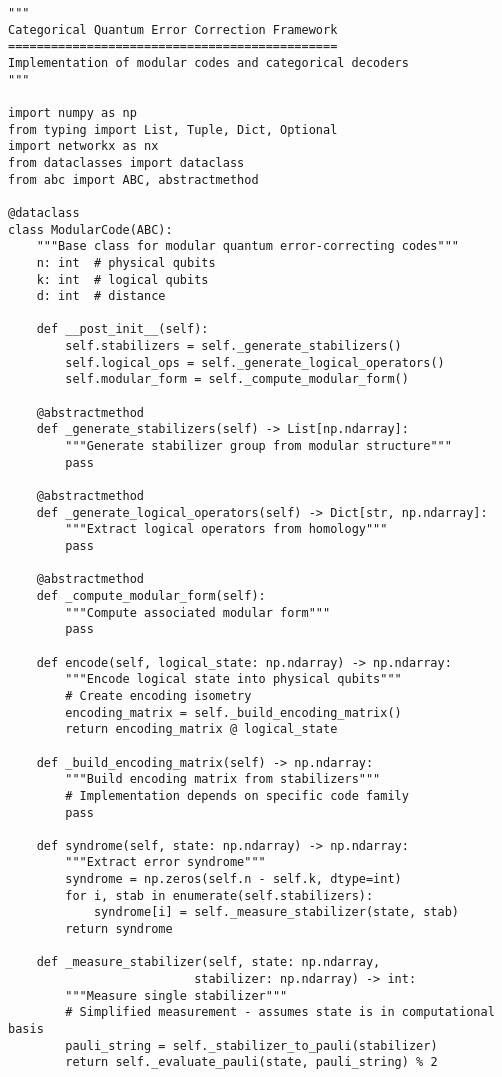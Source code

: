 \documentclass[12pt,a4paper]{article}
\begin{document}
\begin{lstlisting}[style=python,caption=Core categorical QEC classes]
"""
Categorical Quantum Error Correction Framework
==============================================
Implementation of modular codes and categorical decoders
"""

import numpy as np
from typing import List, Tuple, Dict, Optional
import networkx as nx
from dataclasses import dataclass
from abc import ABC, abstractmethod

@dataclass
class ModularCode(ABC):
    """Base class for modular quantum error-correcting codes"""
    n: int  # physical qubits
    k: int  # logical qubits
    d: int  # distance
    
    def __post_init__(self):
        self.stabilizers = self._generate_stabilizers()
        self.logical_ops = self._generate_logical_operators()
        self.modular_form = self._compute_modular_form()
    
    @abstractmethod
    def _generate_stabilizers(self) -> List[np.ndarray]:
        """Generate stabilizer group from modular structure"""
        pass
    
    @abstractmethod
    def _generate_logical_operators(self) -> Dict[str, np.ndarray]:
        """Extract logical operators from homology"""
        pass
    
    @abstractmethod
    def _compute_modular_form(self):
        """Compute associated modular form"""
        pass
    
    def encode(self, logical_state: np.ndarray) -> np.ndarray:
        """Encode logical state into physical qubits"""
        # Create encoding isometry
        encoding_matrix = self._build_encoding_matrix()
        return encoding_matrix @ logical_state
    
    def _build_encoding_matrix(self) -> np.ndarray:
        """Build encoding matrix from stabilizers"""
        # Implementation depends on specific code family
        pass
    
    def syndrome(self, state: np.ndarray) -> np.ndarray:
        """Extract error syndrome"""
        syndrome = np.zeros(self.n - self.k, dtype=int)
        for i, stab in enumerate(self.stabilizers):
            syndrome[i] = self._measure_stabilizer(state, stab)
        return syndrome
    
    def _measure_stabilizer(self, state: np.ndarray, 
                          stabilizer: np.ndarray) -> int:
        """Measure single stabilizer"""
        # Simplified measurement - assumes state is in computational basis
        pauli_string = self._stabilizer_to_pauli(stabilizer)
        return self._evaluate_pauli(state, pauli_string) % 2
    

\end{lstlisting}
\end{document}
